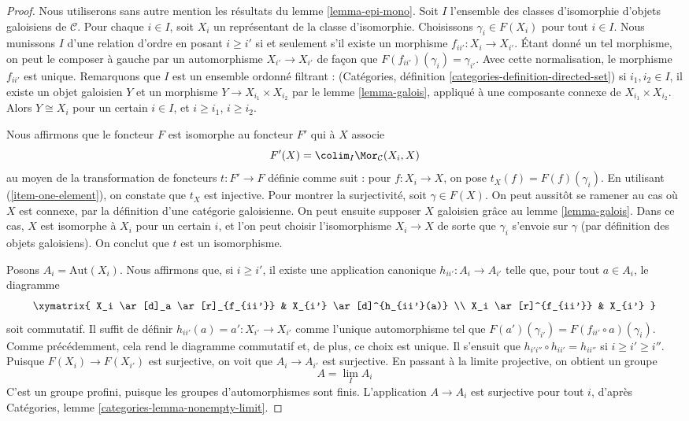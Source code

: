 \begin{proof}
Nous utiliserons sans autre mention les résultats du lemme \ref{lemma-epi-mono}.
Soit $I$ l'ensemble des classes d'isomorphie d'objets galoisiens de $\mathcal{C}$.
Pour chaque $i \in I$, soit $X_i$ un représentant de la classe d'isomorphie.
Choisissons $\gamma_i \in F(X_i)$ pour tout $i \in I$.
Nous munissons $I$ d'une relation d'ordre en posant $i \geq i'$ si
et seulement s'il existe un morphisme $f_{ii'} : X_i \to X_{i'}$.
Étant donné un tel morphisme, on peut le composer à gauche par un automorphisme
$X_{i'} \to X_{i'}$ de façon que $F(f_{ii'})(\gamma_i) = \gamma_{i'}$.
Avec cette normalisation, le morphisme $f_{ii'}$ est unique.
Remarquons que $I$ est un ensemble ordonné filtrant :
(Catégories, définition \ref{categories-definition-directed-set})
si $i_1, i_2 \in I$, il existe un objet galoisien $Y$ et un morphisme
$Y \to X_{i_1} \times X_{i_2}$ par le lemme \ref{lemma-galois}, appliqué
à une composante connexe de $X_{i_1} \times X_{i_2}$.
Alors $Y \cong X_i$ pour un certain $i \in I$, et $i \geq i_1$, $i \geq i_2$.

\medskip\noindent
Nous affirmons que le foncteur $F$ est isomorphe au foncteur $F'$
qui à $X$ associe
$$
F'(X) = \colim_I \Mor_\mathcal{C}(X_i, X)
$$
au moyen de la transformation de foncteurs $t : F' \to F$ définie comme suit :
pour $f : X_i \to X$, on pose $t_X(f) = F(f)(\gamma_i)$.
En utilisant (\ref{item-one-element}), on constate que $t_X$ est injective.
Pour montrer la surjectivité, soit $\gamma \in F(X)$. On peut aussitôt
se ramener au cas où $X$ est connexe, par la définition d'une
catégorie galoisienne. On peut ensuite supposer $X$ galoisien grâce au
lemme \ref{lemma-galois}. Dans ce cas, $X$ est isomorphe à $X_i$
pour un certain $i$, et l'on peut choisir l'isomorphisme $X_i \to X$ de sorte
que $\gamma_i$ s'envoie sur $\gamma$ (par définition des objets galoisiens).
On conclut que $t$ est un isomorphisme.

\medskip\noindent
Posons $A_i = \text{Aut}(X_i)$.
Nous affirmons que, si $i \geq i'$, il existe une application canonique
$h_{ii'} : A_i \to A_{i'}$ telle que, pour tout $a \in A_i$,
le diagramme
$$
\xymatrix{
X_i \ar[d]_a \ar[r]_{f_{ii'}} & X_{i'} \ar[d]^{h_{ii'}(a)} \\
X_i \ar[r]^{f_{ii'}} & X_{i'}
}
$$
soit commutatif. Il suffit de définir $h_{ii'}(a) = a' : X_{i'} \to X_{i'}$
comme l'unique automorphisme tel que
$F(a')(\gamma_{i'}) = F(f_{ii'} \circ a)(\gamma_i)$.
Comme précédemment, cela rend le diagramme commutatif et, de plus, ce choix
est unique.
Il s'ensuit que
$h_{i'i''} \circ h_{ii'} = h_{ii''}$
si $i \geq i' \geq i''$.
Puisque $F(X_i) \to F(X_{i'})$ est surjective, on voit que
$A_i \to A_{i'}$ est surjective.
En passant à la limite projective, on obtient un groupe
$$
A = \lim_I A_i
$$
C'est un groupe profini, puisque les groupes d'automorphismes sont finis.
L'application $A \to A_i$ est surjective pour tout $i$, d'après
Catégories, lemme \ref{categories-lemma-nonempty-limit}.


\end{proof}
